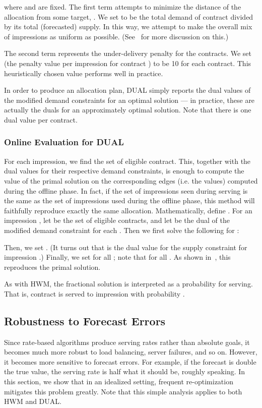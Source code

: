 where  and  are fixed.  The first term attempts to
minimize the distance of the allocation from some target,
.  We set  to be the total demand of contract
 divided by its total (forecasted) supply.  In this way, we
attempt to make the overall mix of impressions as uniform as
possible.  (See~\cite{Informs,CIKM,Ghosh,KDD} for more discussion
on this.)

The second term represents the under-delivery penalty for the
contracts.  We set  (the penalty value per impression for
contract ) to be 10 for each contract.  This heuristically chosen
value performs well in practice.

In order to produce an allocation plan, DUAL simply reports the dual
values of the modified demand constraints for an optimal solution
--- in practice, these are actually the duals for an approximately
optimal solution.  Note that there is one dual value per contract.

\subsubsection{Online Evaluation for DUAL}
For each impression, we find the set of eligible contract.  This,
together with the dual values for their respective demand
constraints, is enough to compute the value of the primal solution
on the corresponding edges (i.e. the  values) computed
during the offline phase.  In fact, if the set of impressions seen
during serving is the same as the set of impressions used during the
offline phase, this method will faithfully reproduce exactly the
same allocation. Mathematically, define .  For an impression , let  be the set of
eligible contracts, and let  be the dual of the modified
demand constraint for each .  Then we first solve the
following for :

Then, we set .  (It turns out that  is
the dual value for the supply constraint for impression .)
Finally, we set  for all ; note that  for all .
As shown in~\cite{EC}, this reproduces the primal solution.

As with HWM, the fractional solution is interpreted as a probability
for serving.  That is, contract  is served to impression  with
probability .

\subsection{Robustness to Forecast Errors}
\label{sec:robust} Since rate-based algorithms produce serving rates
rather than absolute goals, it becomes much more robust to load
balancing, server failures, and so on.  However, it becomes more
sensitive to forecast errors.  For example, if the forecast is
double the true value, the serving rate is half what it should be,
roughly speaking. In this section, we show that in an idealized
setting, frequent re-optimization mitigates this problem greatly.
Note that this simple analysis applies to both HWM and DUAL.

